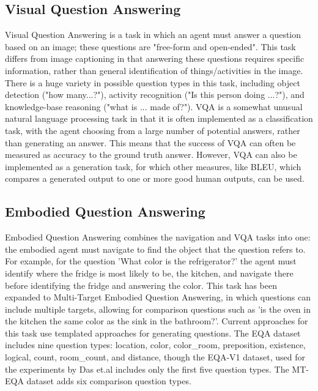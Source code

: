 \documentclass{article}
\begin{document}
\subsection{Visual Question Answering}
Visual Question Answering is a task in which an agent must answer a question based on an image; these questions are "free-form and open-ended"\cite{vqa_2015}. This task differs from image captioning in that answering these questions requires specific information, rather than general identification of things/activities in the image. There is a huge variety in possible question types in this task, including object detection ("how many...?"), activity recognition ("Is this person doing ...?"), and knowledge-base reasoning ("what is ... made of?"). 
VQA is a somewhat unusual natural language processing task in that it is often implemented as a classification task, with the agent choosing from a large number of potential answers, rather than generating an answer. This means that the success of VQA can often be measured as accuracy to the ground truth answer. However, VQA can also be implemented as a generation task, for which other measures, like BLEU, which compares a generated output to one or more good human outputs, can be used\cite{bleu}.

\subsection{Embodied Question Answering}
Embodied Question Answering combines the navigation and VQA tasks into one: the embodied agent must navigate to find the object that the question refers to\cite{embodiedqa}. For example, for the question 'What color is the refrigerator?' the agent must identify where the fridge is most likely to be, the kitchen, and navigate there before identifying the fridge and answering the color. This task has been expanded to Multi-Target Embodied Question Answering, in which questions can include multiple targets, allowing for comparison questions such as 'is the oven in the kitchen the same color as the sink in the bathroom?'\cite{eqa_multitarget}. Current approaches for this task use templated approaches for generating questions. The EQA dataset includes nine question types: location, color, color\_room, preposition, existence, logical, count, room\_count, and distance, though the EQA-V1 dataset, used for the experiments by Das et.al includes only the first five question types\cite{embodiedqa}. The MT-EQA dataset adds six comparison question types\cite{eqa_multitarget}.
\end{document}

